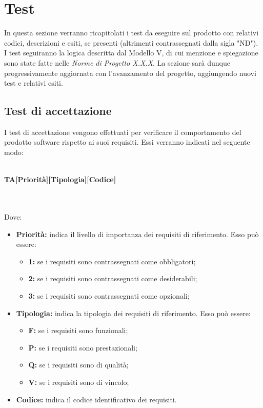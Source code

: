 \section{Test}
In questa sezione verranno ricapitolati i test da eseguire sul prodotto con relativi codici, descrizioni e esiti, se presenti (altrimenti contrassegnati dalla sigla "ND"). I test seguiranno la logica descritta dal Modello V, di cui menzione e spiegazione sono state fatte nelle \textit{Norme di Progetto X.X.X}. La sezione sarà dunque progressivamente aggiornata con l'avanzamento del progetto, aggiungendo nuovi test e relativi esiti. 

\subsection{Test di accettazione}
I test di accettazione vengono effettuati per verificare il comportamento del prodotto software rispetto ai suoi requisiti. Essi verranno indicati nel seguente modo:\\\\
\centerline{\textbf{TA[Priorità][Tipologia][Codice]}}\\\\
Dove:
\begin{itemize}
	\item \textbf{Priorità:} indica il livello di importanza dei requisiti di riferimento. Esso può essere:
	\begin{itemize}
		\item \textbf{1:} se i requisiti sono contrassegnati come obbligatori;
		\item \textbf{2:} se i requisiti sono contrassegnati come desiderabili;
		\item \textbf{3:} se i requisiti sono contrassegnati come opzionali;
	\end{itemize}
	\item \textbf{Tipologia:} indica la tipologia dei requisiti di riferimento. Esso può essere:
	\begin{itemize}
		\item \textbf{F:} se i requisiti sono funzionali;
		\item \textbf{P:} se i requisiti sono prestazionali;
		\item \textbf{Q:} se i requisiti sono di qualità;
		\item \textbf{V:} se i requisiti sono di vincolo;
	\end{itemize}
	\item \textbf{Codice:} indica il codice identificativo dei requisiti.
\end{itemize}


